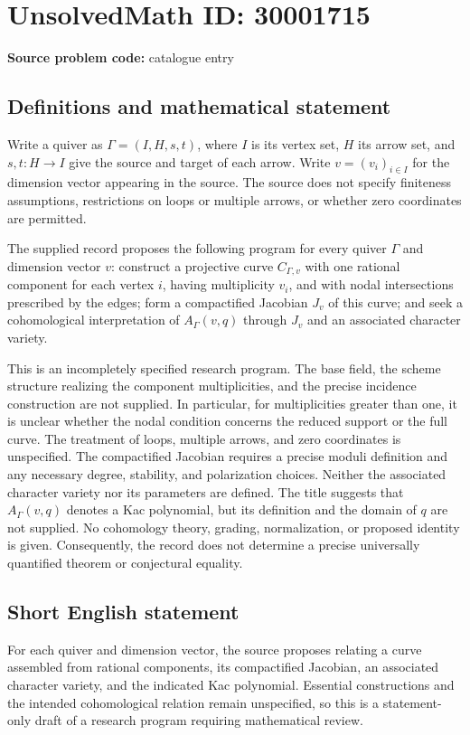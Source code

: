 \documentclass[11pt]{article}
\begin{document}
\section*{UnsolvedMath ID: 30001715}
\textbf{Source problem code:} catalogue entry
\subsection{Definitions and mathematical statement}
Write a quiver as \(\Gamma=(I,H,s,t)\), where \(I\) is its vertex set, \(H\) its arrow set, and \(s,t:H\to I\) give the source and target of each arrow. Write \(v=(v_i)_{i\in I}\) for the dimension vector appearing in the source. The source does not specify finiteness assumptions, restrictions on loops or multiple arrows, or whether zero coordinates are permitted.

The supplied record proposes the following program for every quiver \(\Gamma\) and dimension vector \(v\): construct a projective curve \(C_{\Gamma,v}\) with one rational component for each vertex \(i\), having multiplicity \(v_i\), and with nodal intersections prescribed by the edges; form a compactified Jacobian \(J_v\) of this curve; and seek a cohomological interpretation of \(A_\Gamma(v,q)\) through \(J_v\) and an associated character variety.

This is an incompletely specified research program. The base field, the scheme structure realizing the component multiplicities, and the precise incidence construction are not supplied. In particular, for multiplicities greater than one, it is unclear whether the nodal condition concerns the reduced support or the full curve. The treatment of loops, multiple arrows, and zero coordinates is unspecified. The compactified Jacobian requires a precise moduli definition and any necessary degree, stability, and polarization choices. Neither the associated character variety nor its parameters are defined. The title suggests that \(A_\Gamma(v,q)\) denotes a Kac polynomial, but its definition and the domain of \(q\) are not supplied. No cohomology theory, grading, normalization, or proposed identity is given. Consequently, the record does not determine a precise universally quantified theorem or conjectural equality.
\subsection{Short English statement}
For each quiver and dimension vector, the source proposes relating a curve assembled from rational components, its compactified Jacobian, an associated character variety, and the indicated Kac polynomial. Essential constructions and the intended cohomological relation remain unspecified, so this is a statement-only draft of a research program requiring mathematical review.
\end{document}
